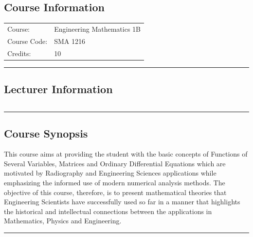 
\subsection*{Course Information}\label{course:sma3116}
\vspace{0ex}%
\noindent\parbox{0.5\textwidth}{%
    \noindent\begin{tabular}{@{}ll}
                 \textsf{Course:}          & 	Engineering Mathematics 1B   \\
                 \textsf{Course Code:}         & 	SMA 1216    \\
                 \textsf{Credits:}    & 	10
    \end{tabular}}
\vspace{2ex}\hrule\vspace{2ex}

\subsection*{Lecturer Information}
\noindent\parbox{0.5\textwidth}{%
    \noindent\begin{tabular}{@{}ll}
                 
    \end{tabular}}
\vspace{2ex}\hrule\vspace{2ex}


\subsection*{Course Synopsis}
This course aims at providing the student with the basic concepts of Functions of Several Variables, Matrices and Ordinary Differential Equations which are motivated by Radiography and Engineering Sciences applications while emphasizing the informed use of modern numerical analysis methods.
The objective of this course, therefore, is to present mathematical theories that Engineering Scientists have successfully used so far in a manner that highlights the historical and intellectual connections between the applications in Mathematics, Physics and Engineering.
\vspace{2ex} \hrule\vspace{2ex}

